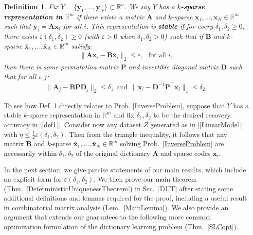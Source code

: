 \documentclass[9pt,twocolumn]{pnas-new}
\newtheorem{definition}{Definition}
\renewcommand{\eqref}[1]{\textnormal{[\ref{#1}]}}
\begin{document}
\begin{definition}\label{maindef}
Fix $Y = \{ \mathbf{y}_1, \ldots, \mathbf{y}_N\} \subset \mathbb{R}^n$. We say $Y$ has a \textbf{$k$-sparse representation in $\mathbb{R}^m$} if there exists a matrix $\mathbf{A}$ and $k$-sparse $\mathbf{x}_1, \ldots, \mathbf{x}_N \in \mathbb{R}^m$ such that $\mathbf{y}_i = \mathbf{A}\mathbf{x}_i$ for all $i$. 
This representation is \textbf{stable} if for every $\delta_1, \delta_2 \geq 0$, there exists $\varepsilon(\delta_1, \delta_2) \geq 0$ (with $\varepsilon > 0$ when  $\delta_1, \delta_2 > 0$) such that if $\mathbf{B}$ and $k$-sparse $\mathbf{\bar x}_1, \ldots, \mathbf{\bar x}_N \in \mathbb{R}^m$ satisfy:
\begin{align*}
\|\mathbf{A}\mathbf{x}_i - \mathbf{B}\mathbf{\bar x}_i\|_2 \leq \varepsilon,\ \ \   \text{for all $i$},
\end{align*}
then there is some permutation matrix $\mathbf{P}$ and invertible diagonal matrix $\mathbf{D}$ such that for all $i, j$:
\begin{align}\label{def1}
\|\mathbf{A}_j - \mathbf{BPD}_j\|_2 \leq \delta_1 \ \ \text{and} \ \ \|\mathbf{x}_i - \mathbf{D}^{-1}\mathbf{P}^{\top}\mathbf{\bar x}_i\|_1 \leq \delta_2.
\end{align}
\end{definition}

\pagebreak

To see how Def. \ref{maindef} directly relates to Prob. \ref{InverseProblem}, suppose that $Y$ has a stable $k$-sparse representation in $\mathbb{R}^m$ and fix $\delta_1, \delta_2$ to be the desired recovery accuracy in \eqref{def1}. Consider now any dataset $Z$ generated as in \eqref{LinearModel} with $\eta \leq \frac{1}{2} \varepsilon(\delta_1, \delta_2)$. Then from the triangle inequality, it follows that any matrix $\mathbf{B}$ and $k$-sparse $\mathbf{\bar x}_1, \ldots, \mathbf{\bar x}_N \in \mathbb{R}^m$ solving Prob.~\ref{InverseProblem} are necessarily within $\delta_1, \delta_2$ of the original dictionary $\mathbf{A}$ and sparse codes $\mathbf{x}_i$. 

In the next section, we give precise statements of our main results, which include an explicit form for $\varepsilon(\delta_1, \delta_2)$. We then prove our main theorem (Thm.~\ref{DeterministicUniquenessTheorem}) in Sec.~\ref{DUT} after stating some additional definitions and lemmas required for the proof, including a useful result in combinatorial matrix analysis (Lem.~\ref{MainLemma}). We also provide an argument that extends our guarantees to the following more common optimization formulation of the dictionary learning problem (Thm.~\ref{SLCopt}).
\end{document}
